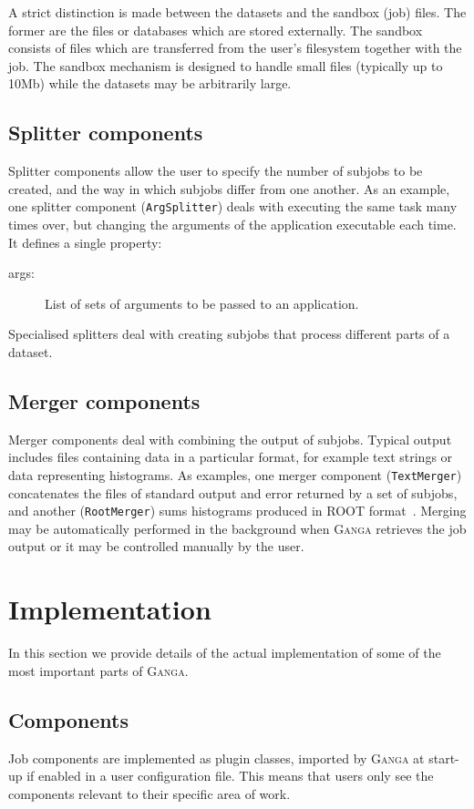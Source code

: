 \documentclass{elsart}
\def\ganga {\textsc{Ganga}\xspace}
\newcommand{\code}[1]{\texttt{#1}}
\begin{document}
A strict distinction is made between the datasets and the sandbox (job)
files.  The former are the files or databases which are stored
externally.  The sandbox consists of files which are transferred from
the user's filesystem together with the job.  The sandbox mechanism is
designed to handle small files (typically up to 10Mb) while the
datasets may be arbitrarily large.

\subsection{Splitter components}
Splitter components allow the user to specify the number of subjobs to be
created, and the way in which subjobs differ from one another. As an example,
one splitter component (\code{ArgSplitter}) deals with executing the same task
many times over, but changing the arguments of the application executable each
time. It defines a single property:
\begin{description}
\item[args:] List of sets of arguments to be passed to an application.
\end{description}
Specialised splitters deal with creating subjobs that process different parts
of a dataset.

\subsection{Merger components}
Merger components deal with combining the output of
subjobs. Typical output includes files containing data in a
particular format, for example text strings or data representing
histograms. As examples, one merger component (\code{TextMerger})
concatenates the files of standard output and error returned by a set
of subjobs, and another (\code{RootMerger}) sums histograms produced
in ROOT format~\cite{ROOT}. Merging may be automatically performed in
the background when \ganga retrieves the job output or it may be
controlled manually by the user.

\section{Implementation}
\label{sec:implementation}
In this section we provide details of the actual implementation of some of the
most important parts of \ganga.

\subsection{Components}
\label{sec:ComponentImplementation}
Job components are implemented as plugin classes, imported by \ganga
at start-up if enabled in a user configuration file. This means that
users only see the components relevant to their specific area of
work.
\end{document}
